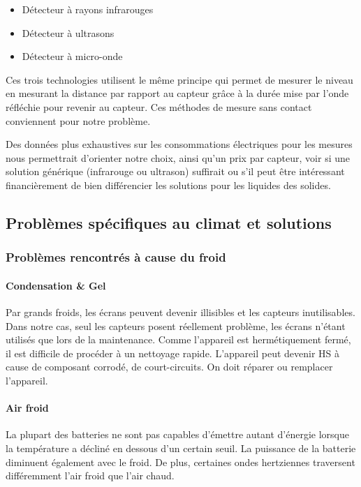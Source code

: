 \begin{itemize}
\item Détecteur à rayons infrarouges
\item Détecteur à ultrasons
\item Détecteur à micro-onde
\end{itemize}

Ces trois technologies utilisent le même principe qui permet de mesurer le niveau en mesurant la distance par rapport au capteur grâce à la durée mise par l’onde réfléchie pour revenir au capteur. Ces méthodes de mesure sans contact conviennent pour notre problème.

Des données plus exhaustives sur les consommations électriques pour les mesures nous permettrait d’orienter notre choix, ainsi qu’un prix par capteur, voir si une solution générique (infrarouge ou ultrason) suffirait ou s’il peut être intéressant financièrement de bien différencier les solutions pour les liquides des solides.

\subsection{Problèmes spécifiques au climat et solutions}

\subsubsection{Problèmes rencontrés à cause du froid}

\paragraph{Condensation \&  Gel}

Par grands froids, les écrans peuvent devenir illisibles et les capteurs inutilisables. Dans notre cas, seul les capteurs posent réellement problème, les écrans n'étant utilisés que lors de la maintenance.
Comme l’appareil est hermétiquement fermé, il est difficile de procéder à un nettoyage rapide. L’appareil peut devenir HS à cause de composant corrodé, de court-circuits. On doit réparer ou remplacer l’appareil.

\paragraph{Air froid}

La plupart des batteries ne sont pas capables d’émettre autant d'énergie lorsque la température a décliné en dessous d'un certain seuil. La puissance de la batterie diminuent également avec le froid.
De plus, certaines ondes hertziennes traversent différemment l’air froid que l’air chaud\footnotemark.

